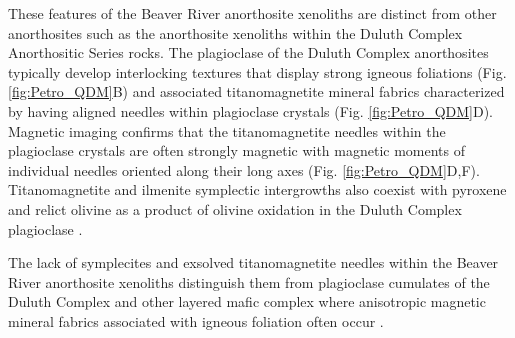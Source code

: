 \documentclass[9pt,twocolumn,twoside,lineno]{pnas-new}
\begin{document}
These features of the Beaver River anorthosite xenoliths are distinct from other anorthosites such as the anorthosite xenoliths within the Duluth Complex Anorthositic Series rocks. The plagioclase of the Duluth Complex anorthosites typically develop interlocking textures that display strong igneous foliations (Fig. \ref{fig:Petro_QDM}B) and associated titanomagnetite mineral fabrics characterized by having aligned needles within plagioclase crystals (Fig. \ref{fig:Petro_QDM}D). Magnetic imaging confirms that the titanomagnetite needles within the plagioclase crystals are often strongly magnetic with magnetic moments of individual needles oriented along their long axes (Fig. \ref{fig:Petro_QDM}D,F). Titanomagnetite and ilmenite symplectic intergrowths also coexist with pyroxene and relict olivine as a product of olivine oxidation in the Duluth Complex plagioclase \cite{Miller1990a}.

The lack of symplecites and exsolved titanomagnetite needles within the Beaver River anorthosite xenoliths distinguish them from plagioclase cumulates of the Duluth Complex and other layered mafic complex where anisotropic magnetic mineral fabrics associated with igneous foliation often occur \cite{Scofield1986a, Selkin2000a, Feinberg2006a}. 

\end{document}

